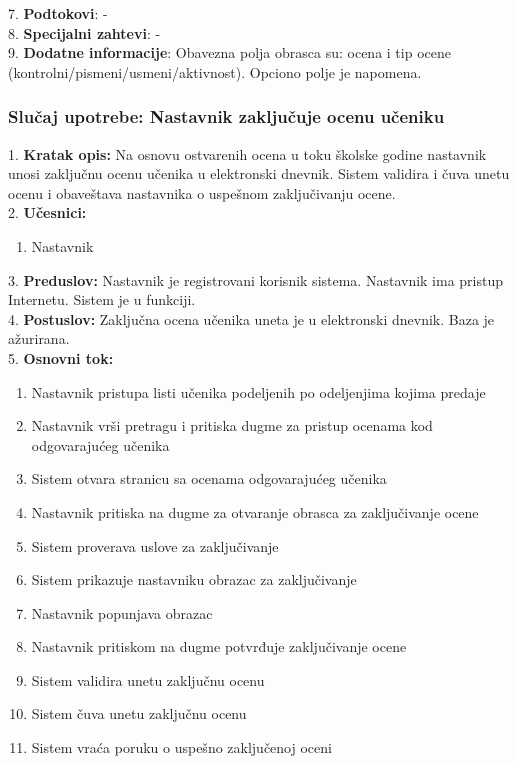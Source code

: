 \documentclass{article}
\begin{document}
7. \textbf{Podtokovi}: - \\

8. \textbf{Specijalni zahtevi}: - \\

9. \textbf{Dodatne informacije}: Obavezna polja obrasca su: ocena i tip ocene (kontrolni/pismeni/usmeni/aktivnost). Opciono polje je napomena. \\


\subsubsection{Slučaj upotrebe: Nastavnik zaključuje ocenu učeniku} 
1. \textbf{Kratak opis:} Na osnovu ostvarenih ocena u toku školske godine nastavnik unosi zaključnu ocenu učenika u elektronski dnevnik. Sistem validira i čuva unetu ocenu i obaveštava nastavnika o uspešnom zaključivanju ocene. \\

2. \textbf{Učesnici:}
\begin{enumerate} [label=(\alph*)]
\item Nastavnik
\end{enumerate} 

3. \textbf{Preduslov:} Nastavnik je registrovani korisnik sistema. Nastavnik ima pristup Internetu. Sistem je u funkciji. \\

4. \textbf{Postuslov:} Zaključna ocena učenika uneta je u elektronski dnevnik. Baza je ažurirana. \\

5. \textbf{Osnovni tok:} 
\begin{enumerate} [label=(\alph*)]
\item Nastavnik pristupa listi učenika podeljenih po odeljenjima kojima predaje
\item Nastavnik vrši pretragu i pritiska dugme za pristup ocenama kod odgovarajućeg učenika
\item Sistem otvara stranicu sa ocenama odgovarajućeg učenika
\item Nastavnik pritiska na dugme za otvaranje obrasca za zaključivanje ocene
\item Sistem proverava uslove za zaključivanje
\item Sistem prikazuje nastavniku obrazac za zaključivanje 
\item Nastavnik popunjava obrazac
\item Nastavnik pritiskom na dugme potvrđuje zaključivanje ocene
\item Sistem validira unetu zaključnu ocenu
\item Sistem čuva unetu zaključnu ocenu
\item Sistem vraća poruku o uspešno zaključenoj oceni
\end{enumerate}
\end{document}
